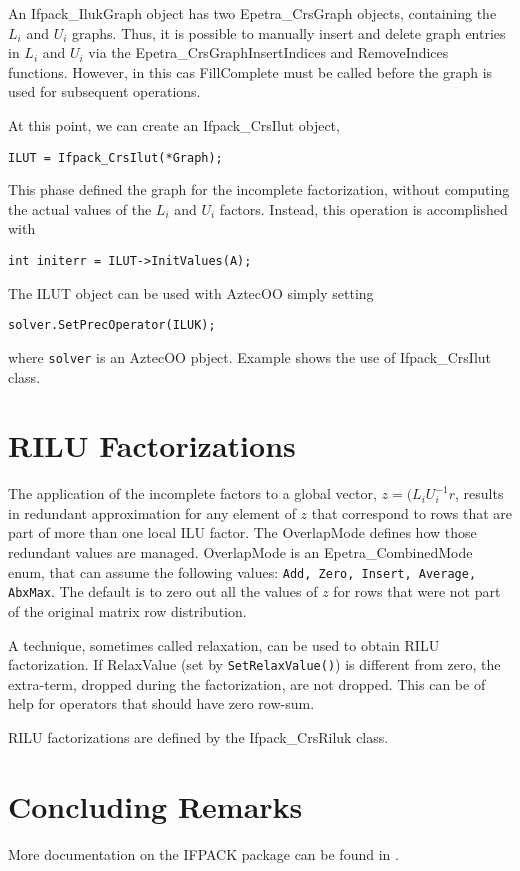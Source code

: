 \begin{remark}
  An Ifpack\_IlukGraph object has two Epetra\_CrsGraph objects,
  containing the $L_i$ and $U_i$ graphs. Thus, it is possible to
  manually insert and delete graph entries in $L_i$ and $U_i$ via the
  Epetra\_CrsGraphInsertIndices and RemoveIndices functions. However, in
  this cas FillComplete must be called before the graph is used for
  subsequent operations.
\end{remark}

At this point, we can create an Ifpack\_CrsIlut object,
\begin{verbatim}
ILUT = Ifpack_CrsIlut(*Graph);
\end{verbatim}
This phase defined the graph for the incomplete factorization, without
computing the actual values of the $L_i$ and $U_i$ factors. Instead,
this operation is accomplished with
\begin{verbatim}
int initerr = ILUT->InitValues(A);
\end{verbatim}
The ILUT object can be used with AztecOO simply setting
\begin{verbatim}
solver.SetPrecOperator(ILUK);
\end{verbatim}
where \verb!solver! is an AztecOO pbject.
\smallskip
Example  shows the use of Ifpack\_CrsIlut class.


\section{RILU  Factorizations}
\label{sec:ifpack_rilu}

The application of the incomplete factors to a global vector, $z =
(L_iU_i^{-1} r$, results in redundant approximation for any element of
$z$ that correspond to rows that are part of more than one local ILU
factor. The OverlapMode defines how those redundant values are
managed. OverlapMode is an Epetra\_CombinedMode enum, that can assume
the following values: {\tt Add, Zero, Insert, Average, AbxMax}. The
default is to zero out all the values of $z$ for rows that were not part
of the original matrix row distribution.

A technique, sometimes called relaxation, can be used to obtain RILU
factorization. If RelaxValue (set by \verb!SetRelaxValue()!) is
different from zero, the extra-term, dropped during the factorization,
are not dropped. This can be of help for operators that should have zero
row-sum. 

RILU factorizations are defined by the Ifpack\_CrsRiluk class.



\section{Concluding Remarks}
\label{sec:ifpack_concluding}

More documentation on the IFPACK package can be found in
\cite{Ifpack-Ref-Guide,Ifpack-User-Guide}.

